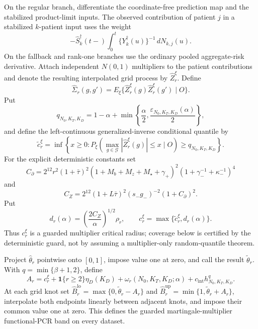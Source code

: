 On the regular branch, differentiate the coordinate-free prediction map and the stabilized product-limit inputs. The observed contribution of patient \(j\) in a stabilized \(k\)-patient input uses the weight
\[
 -\widehat S_k^\dagger(t-)
 \int_0^t\{Y_k^\dagger(u)\}^{-1}\,dN_{k,j}(u).
\]
On the fallback and rank-one branches use the ordinary pooled aggregate-risk derivative. Attach independent \(N(0,1)\) multipliers to the patient contributions and denote the resulting interpolated grid process by \(\widehat Z_r^\xi\). Define
\[
 \widehat\Sigma_r(g,g')
 =E_\xi\{\widehat Z_r^\xi(g)\widehat Z_r^\xi(g')\mid O\}.
\]
Put
\[
 q_{N_0,K_T,K_D}=1-\alpha+
 \min\left\{\frac\alpha2,
 \frac{\varepsilon_{N_0,K_T,K_D}(\alpha)}2\right\},
\]
and define the left-continuous generalized-inverse conditional quantile by
\[
 \widetilde c_r^\xi=
 \inf\left\{x\ge0:
 P_\xi\left(\max_{g\in\mathcal G}|\widehat Z_r^\xi(g)|\le x
 \mid O\right)\ge q_{N_0,K_T,K_D}\right\}.
\]
For the explicit deterministic constants set
\[
 C_\partial=2^{12}r^2(1+\bar\tau)^2
 (1+M_b+M_z+M_\star+\gamma_+)^2
 (1+\gamma_-^{-1}+\kappa_-^{-1})^4
\]
and
\[
 C_Z=2^{12}(1+L\bar\tau)^2(s_-g_-)^{-2}(1+C_\partial)^2.
\]
Put
\[
 d_r(\alpha)=\left(\frac{2C_Z}{\alpha}\right)^{1/2}\rho_r,
 \qquad c_r^\xi=\max\{\widetilde c_r^\xi,d_r(\alpha)\}.
\]
Thus \(c_r^\xi\) is a guarded multiplier critical radius; coverage below is certified by the deterministic guard, not by assuming a multiplier-only random-quantile theorem.

Project \(\widehat\theta_r\) pointwise onto \([0,1]\), impose value one at zero, and call the result \(\widetilde\theta_r\). With \(q=\min\{\beta+1,2\}\), define
\[
 A_r=c_r^\xi+\mathbf1\{r\ge2\}\eta_D(K_D)
 +\omega_r(N_0,K_T,K_D;\alpha)+c_{\mathrm{int}}h_{N_0,K_T,K_D}^{q}.
\]
At each grid knot set \(\widehat B_r^{\mathrm{lo}}=\max\{0,\widetilde\theta_r-A_r\}\) and \(\widehat B_r^{\mathrm{up}}=\min\{1,\widetilde\theta_r+A_r\}\), interpolate both endpoints linearly between adjacent knots, and impose their common value one at zero. This defines the guarded martingale-multiplier functional-PCR band on every dataset.